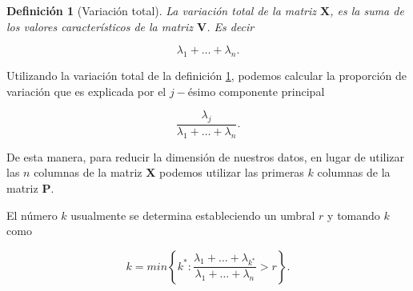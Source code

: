 \documentclass[11pt]{report}
\theoremstyle{break}
\newtheorem{definicion}{Definición}[chapter]
\theoremstyle{break}
\begin{document}
\begin{definicion}[Variación total]
\label{definicion:variacion total}
La variación total de la matriz $\bm{X}$, es la suma de los valores característicos de la matriz $\bm{V}$. Es decir

$$\lambda_1 + \ldots + \lambda_n.$$
\end{definicion}

Utilizando la variación total de la definición \ref{definicion:variacion total}, podemos calcular la proporción de variación que es explicada por el $j-$ésimo componente principal

$$ \dfrac{\lambda_j}{\lambda_1 + \ldots + \lambda_n}.$$

De esta manera, para reducir la dimensión de nuestros datos, en lugar de utilizar las $n$ columnas de la matriz $\bm{X}$ podemos utilizar las primeras $k$ columnas de la matriz $\bm{P}$.

El número $k$ usualmente se determina estableciendo un umbral $r$ y tomando $k$ como

$$ k = min \left\lbrace k^*: \dfrac{\lambda_1 + \ldots + \lambda_{k^*} }{\lambda_1 + \ldots + \lambda_n} > r \right\rbrace.$$
\end{document}
